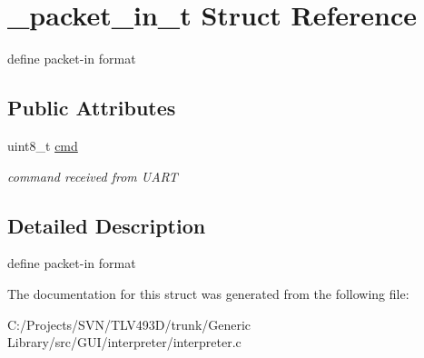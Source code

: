 \hypertarget{struct__packet__in__t}{}\section{\+\_\+packet\+\_\+in\+\_\+t Struct Reference}
\label{struct__packet__in__t}


define packet-\/in format  


\subsection*{Public Attributes}
\begin{DoxyCompactItemize}
\item 
\mbox{\label{struct__packet__in__t_a56b35a583d568c296cb554c320b737a9}} 
uint8\+\_\+t \mbox{\hyperlink{struct__packet__in__t_a56b35a583d568c296cb554c320b737a9}{cmd}}
\begin{DoxyCompactList}\small\item\em command received from U\+A\+RT \end{DoxyCompactList}\end{DoxyCompactItemize}


\subsection{Detailed Description}
define packet-\/in format 

The documentation for this struct was generated from the following file\+:\begin{DoxyCompactItemize}
\item 
C\+:/\+Projects/\+S\+V\+N/\+T\+L\+V493\+D/trunk/\+Generic Library/src/\+G\+U\+I/interpreter/interpreter.\+c\end{DoxyCompactItemize}
